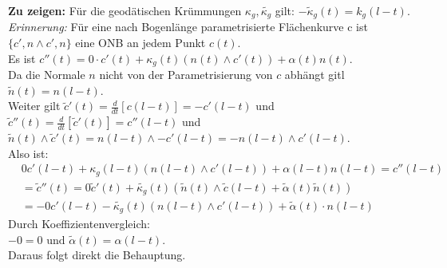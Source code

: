 \begin{problem*}[3]
\textbf{Zu zeigen:} Für die geodätischen Krümmungen $\kappa_g, \tilde{\kappa_g}$ gilt: $-\tilde{ \kappa }_g(t) = k_g(l-t)$.\\
\emph{Erinnerung:} Für eine nach Bogenlänge parametrisierte Flächenkurve c ist $\{ c', n \land c', n \}$ eine ONB an jedem Punkt $c(t)$. \\
Es ist $c''(t) = 0 \cdot c'(t) + \kappa_g(t)(n(t) \land c'(t)) + \alpha(t) n(t)$. \\
Da die Normale $ n $ nicht von der Parametrisierung von $ c $ abhängt gitl $\tilde{ n }(t) = n(l-t)$. \\
Weiter gilt $ \tilde{ c }'(t) = \frac{d}{dt}[c(l-t)] = - c'(l-t)$ und \\
$\tilde{ c }''(t) = \frac{d}{dt}[\tilde{ c }'(t)] = c''(l-t)$ und \\
$\tilde{ n }(t) \land \tilde{ c }'(t) = n(l-t) \land - c'(l-t) = -n (l-t) \land c'(l-t)$. \\
Also ist:
\begin{align*}
& 0c'(l-t) + \kappa_g(l-t)(n(l-t) \land c'(l-t)) + \alpha(l-t)n(l-t) = c''(l-t) \\
&= \tilde{ c }''(t) = 0\tilde{ c }'(t) + \tilde{\kappa_g}(t)(\tilde{ n }(t) \land \tilde{c}(l-t) + \tilde{\alpha}(t) \tilde{n}(t)) \\
&= -0 c'(l-t) - \tilde{\kappa_g}(t)(n(l-t) \land c'(l-t)) + \tilde{ \alpha }(t) \cdot n(l-t)
\end{align*}
Durch Koeffizientenvergleich: \\
$-0 = 0 \text{ und } \tilde{ \alpha }(t) = \alpha(l-t)$.\\
Daraus folgt direkt die Behauptung.

\end{problem*}


